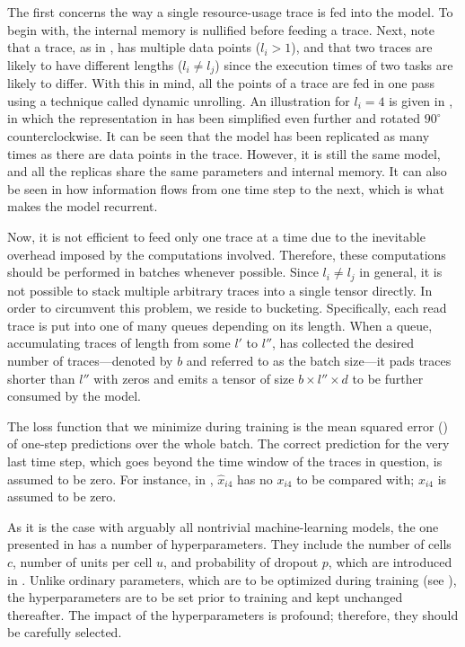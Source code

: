 The first concerns the way a single resource-usage trace is fed into the model.
To begin with, the internal memory is nullified before feeding a trace. Next,
note that a trace, as in , has multiple data points ($l_i > 1$), and
that two traces are likely to have different lengths ($l_i \neq l_j$) since the
execution times of two tasks are likely to differ. With this in mind, all the
points of a trace are fed in one pass using a technique called dynamic
unrolling. An illustration for $l_i = 4$ is given in , in which the
representation in  has been simplified even further and rotated
$90^\circ$ counterclockwise. It can be seen that the model has been replicated
as many times as there are data points in the trace. However, it is still the
same model, and all the replicas share the same parameters and internal memory.
It can also be seen in  how information flows from one time step to
the next, which is what makes the model recurrent.

Now, it is not efficient to feed only one trace at a time due to the inevitable
overhead imposed by the computations involved. Therefore, these computations
should be performed in batches whenever possible. Since $l_i \neq l_j$ in
general, it is not possible to stack multiple arbitrary traces into a single
tensor directly. In order to circumvent this problem, we reside to bucketing.
Specifically, each read trace is put into one of many queues depending on its
length. When a queue, accumulating traces of length from some $l'$ to $l''$, has
collected the desired number of traces---denoted by $b$ and referred to as the
batch size---it pads traces shorter than $l''$ with zeros and emits a tensor of
size $b \times l'' \times d$ to be further consumed by the model.

The loss function that we minimize during training is the mean squared error
() \cite{hastie2009} of one-step predictions over the whole batch. The
correct prediction for the very last time step, which goes beyond the time
window of the traces in question, is assumed to be zero. For instance, in
, $\hat{x}_{i4}$ has no $x_{i4}$ to be compared with; $x_{i4}$ is
assumed to be zero.

As it is the case with arguably all nontrivial machine-learning models, the one
presented in  has a number of hyperparameters. They include the
number of cells $c$, number of units per cell $u$, and probability of dropout
$p$, which are introduced in . Unlike ordinary parameters, which
are to be optimized during training (see ), the hyperparameters
are to be set prior to training and kept unchanged thereafter. The impact of the
hyperparameters is profound; therefore, they should be carefully selected.

